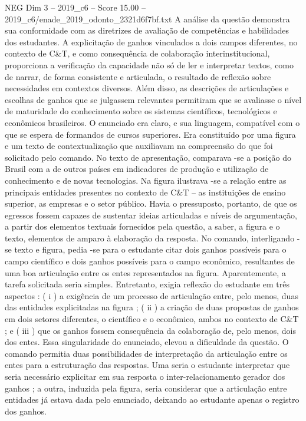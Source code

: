 \begin{textsample}{NEG Dim 3 – 2019\_c6 – Score 15.00 – 2019\_c6/enade\_2019\_odonto\_2321d6f7bf.txt}
A análise da questão demonstra sua conformidade com as diretrizes de avaliação de competências e habilidades dos estudantes.
A explicitação de ganhos vinculados a dois campos diferentes, no contexto de C\&T, e como consequência de colaboração interinstitucional, proporciona a verificação da capacidade não só de ler e interpretar textos, como de narrar, de forma consistente e articulada, o resultado de reflexão sobre necessidades em contextos diversos.
Além disso, as descrições de articulações e escolhas de ganhos que se julgassem relevantes permitiram que se avaliasse o nível de maturidade do conhecimento sobre os sistemas científicos, tecnológicos e econômicos brasileiros.
O enunciado era claro, e sua linguagem, compatível com o que se espera de formandos de cursos superiores.
Era constituído por uma figura e um texto de contextualização que auxiliavam na compreensão do que foi solicitado pelo comando.
No texto de apresentação, comparava -se a posição do Brasil com a de outros países em indicadores de produção e utilização de conhecimento e de novas tecnologias.
Na figura ilustrava -se a relação entre as principais entidades presentes no contexto de C\&T – as instituições de ensino superior, as empresas e o setor público.
Havia o pressuposto, portanto, de que os egressos fossem capazes de sustentar ideias articuladas e níveis de argumentação, a partir dos elementos textuais fornecidos pela questão, a saber, a figura e o texto, elementos de amparo à elaboração da resposta.
No comando, interligando -se texto e figura, pedia -se para o estudante citar dois ganhos possíveis para o campo científico e dois ganhos possíveis para o campo econômico, resultantes de uma boa articulação entre os entes representados na figura.
Aparentemente, a tarefa solicitada seria simples.
Entretanto, exigia reflexão do estudante em três aspectos : ( i ) a exigência de um processo de articulação entre, pelo menos, duas das entidades explicitadas na figura ; ( ii ) a criação de duas propostas de ganhos em dois setores diferentes, o científico e o econômico, ambos no contexto de C\&T ; e ( iii ) que os ganhos fossem consequência da colaboração de, pelo menos, dois dos entes.
Essa singularidade do enunciado, elevou a dificuldade da questão.
O comando permitia duas possibilidades de interpretação da articulação entre os entes para a estruturação das respostas.
Uma seria o estudante interpretar que seria necessário explicitar em sua resposta o inter-relacionamento gerador dos ganhos ; a outra, induzida pela figura, seria considerar que a articulação entre entidades já estava dada pelo enunciado, deixando ao estudante apenas o registro dos ganhos.

\end{textsample}
